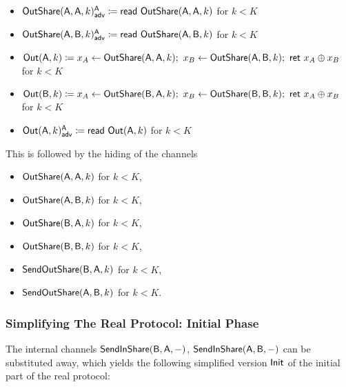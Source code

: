 \begin{itemize}
\item {\color{blue} $\mathsf{OutShare}(\mathsf{A},\mathsf{A},k)^{\mathsf{A}}_{\mathsf{adv}} \coloneqq \mathsf{read} \ \mathsf{OutShare}(\mathsf{A},\mathsf{A},k)$ for $k < K$}
\item {\color{blue} $\mathsf{OutShare}(\mathsf{A},\mathsf{B},k)^{\mathsf{A}}_{\mathsf{adv}} \coloneqq \mathsf{read} \ \mathsf{OutShare}(\mathsf{A},\mathsf{B},k)$ for $k < K$}
\item $\mathsf{Out}(\mathsf{A},k) \coloneqq x_A \leftarrow \mathsf{OutShare}(\mathsf{A},\mathsf{A},k); \ x_B \leftarrow \mathsf{OutShare}(\mathsf{A},\mathsf{B},k); \ \mathsf{ret} \ x_A \oplus x_B$ for $k < K$
\item $\mathsf{Out}(\mathsf{B},k) \coloneqq x_A \leftarrow \mathsf{OutShare}(\mathsf{B},\mathsf{A},k); \ x_B \leftarrow \mathsf{OutShare}(\mathsf{B},\mathsf{B},k); \ \mathsf{ret} \ x_A \oplus x_B$ for $k < K$
\item {\color{blue} $\mathsf{Out}(\mathsf{A},k)^{\mathsf{A}}_{\mathsf{adv}} \coloneqq \mathsf{read} \ \mathsf{Out}(\mathsf{A},k)$ for $k < K$}
\end{itemize}
This is followed by the hiding of the channels
\begin{itemize}
\item $\mathsf{OutShare}(\mathsf{A},\mathsf{A},k)$ for $k < K$,
\item $\mathsf{OutShare}(\mathsf{A},\mathsf{B},k)$ for $k < K$,
\item $\mathsf{OutShare}(\mathsf{B},\mathsf{A},k)$ for $k < K$,
\item $\mathsf{OutShare}(\mathsf{B},\mathsf{B},k)$ for $k < K$,
\item $\mathsf{SendOutShare}(\mathsf{B},\mathsf{A},k)$ for $k < K$,
\item $\mathsf{SendOutShare}(\mathsf{A},\mathsf{B},k)$ for $k < K$.
\end{itemize}

\subsubsection{Simplifying The Real Protocol: Initial Phase}
The internal channels $\mathsf{SendInShare}(\mathsf{B},\mathsf{A},-)$, $\mathsf{SendInShare}(\mathsf{A},\mathsf{B},-)$ can be substituted away, which yields the following simplified version $\mathsf{Init}$ of the initial part of the real protocol:

